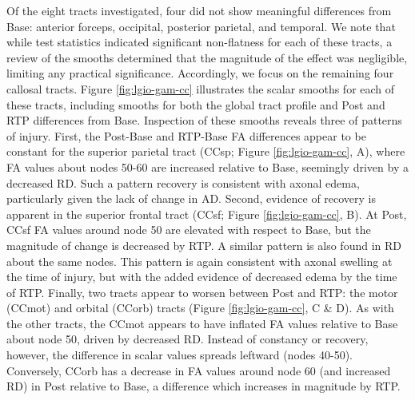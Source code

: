 \documentclass[12pt]{article}
\begin{document}
Of the eight tracts investigated, four did not show meaningful differences from Base: anterior forceps, occipital, posterior parietal, and temporal. We note that while test statistics indicated significant non-flatness for each of these tracts, a review of the smooths determined that the magnitude of the effect was negligible, limiting any practical significance. Accordingly, we focus on the remaining four callosal tracts. Figure \ref{fig:lgio-gam-cc} illustrates the scalar smooths for each of these tracts, including smooths for both the global tract profile and Post and RTP differences from Base. Inspection of these smooths reveals three of patterns of injury. First, the Post-Base and RTP-Base FA differences appear to be constant for the superior parietal tract (CCsp; Figure \ref{fig:lgio-gam-cc}, A), where FA values about nodes 50-60 are increased relative to Base, seemingly driven by a decreased RD. Such a pattern recovery is consistent with axonal edema, particularly given the lack of change in AD. Second, evidence of recovery is apparent in the superior frontal tract (CCsf; Figure \ref{fig:lgio-gam-cc}, B). At Post, CCsf FA values around node 50 are elevated with respect to Base, but the magnitude of change is decreased by RTP. A similar pattern is also found in RD about the same nodes. This pattern is again consistent with axonal swelling at the time of injury, but with the added evidence of decreased edema by the time of RTP. Finally, two tracts appear to worsen between Post and RTP: the motor (CCmot) and orbital (CCorb) tracts (Figure \ref{fig:lgio-gam-cc}, C \& D). As with the other tracts, the CCmot appears to have inflated FA values relative to Base about node 50, driven by decreased RD. Instead of constancy or recovery, however, the difference in scalar values spreads leftward (nodes 40-50). Conversely, CCorb has a decrease in FA values around node 60 (and increased RD) in Post relative to Base, a difference which increases in magnitude by RTP.
\end{document}
